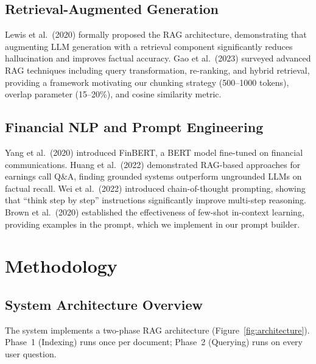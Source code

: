 \documentclass[12pt,a4paper]{article}
\begin{document}
\subsection{Retrieval-Augmented Generation}

Lewis et al.\ (2020) formally proposed the RAG architecture, demonstrating that augmenting LLM generation with a retrieval component significantly reduces hallucination and improves factual accuracy. Gao et al.\ (2023) surveyed advanced RAG techniques including query transformation, re-ranking, and hybrid retrieval, providing a framework motivating our chunking strategy (500--1000 tokens), overlap parameter (15--20\%), and cosine similarity metric.

\subsection{Financial NLP and Prompt Engineering}

Yang et al.\ (2020) introduced FinBERT, a BERT model fine-tuned on financial communications. Huang et al.\ (2022) demonstrated RAG-based approaches for earnings call Q\&A, finding grounded systems outperform ungrounded LLMs on factual recall. Wei et al.\ (2022) introduced chain-of-thought prompting, showing that ``think step by step'' instructions significantly improve multi-step reasoning. Brown et al.\ (2020) established the effectiveness of few-shot in-context learning, providing examples in the prompt, which we implement in our prompt builder.

\section{Methodology}

\subsection{System Architecture Overview}

The system implements a two-phase RAG architecture (Figure~\ref{fig:architecture}). Phase~1 (Indexing) runs once per document; Phase~2 (Querying) runs on every user question.
\end{document}
